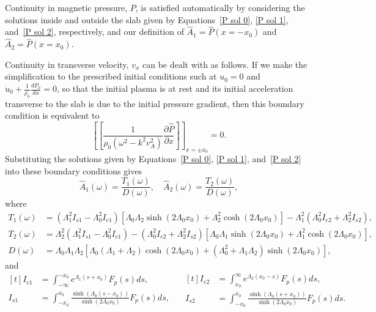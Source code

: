 \documentclass{aastex61}
\begin{document}
Continuity in magnetic pressure, $P$, is satisfied automatically by considering the solutions inside and outside the slab given by Equations~\eqref{P sol 0}, \eqref{P sol 1}, and~\eqref{P sol 2}, respectively, and our definition of $\hat{A}_1 = \hat{P}(x=-x_0)$ and $\hat{A}_2 = \hat{P}(x=x_0)$.

Continuity in transverse velocity, $v_x$ can be dealt with as follows. If we make the simplification to the prescribed initial conditions such at $u_0 = 0$ and $\dot{u}_0 + \frac{1}{\rho_0}\frac{dP_0}{dx} = 0$, so that the initial plasma is at rest and its initial acceleration transverse to the slab is due to the initial pressure gradient, then this boundary condition is equivalent to
\begin{equation}
\left[ \left[ \frac{1}{\rho_0(\omega^2 - k^2v_A^2)} \frac{\partial \hat{P}}{\partial x} \right] \right]_{x=\pm x_0} = 0.
\end{equation}
Substituting the solutions given by Equations~\eqref{P sol 0}, \eqref{P sol 1}, and~\eqref{P sol 2} into these boundary conditions gives
\begin{equation}
\hat{A}_1(\omega) = \frac{T_1(\omega)}{D(\omega)}, \quad \hat{A}_2(\omega) = \frac{T_2(\omega)}{D(\omega)},
\end{equation}
where
\begin{align}
T_1(\omega) & = (\Lambda_1^2 I_{s1} - \Lambda_0^2I_{e1})[\Lambda_0\Lambda_2\sinh(2\Lambda_0x_0) + \Lambda_2^2\cosh(2\Lambda_0x_0)] - \Lambda_1^2(\Lambda_0^2 I_{e2} + \Lambda_2^2 I_{s2}), \\
T_2(\omega) & = \Lambda_2^2(\Lambda_1^2 I_{s1} - \Lambda_0^2I_{e1}) - (\Lambda_0^2 I_{e2} + \Lambda_2^2 I_{s2})[\Lambda_0\Lambda_1\sinh(2\Lambda_0x_0) + \Lambda_1^2\cosh(2\Lambda_0x_0)], \\
D(\omega) & = \Lambda_0\Lambda_1\Lambda_2[\Lambda_0(\Lambda_1 + \Lambda_2)\cosh(2\Lambda_0x_0) + (\Lambda_0^2 + \Lambda_1\Lambda_2)\sinh(2\Lambda_0x_0)],
\label{D}
\end{align}
and
\begin{equation}
\begin{aligned}[t]
I_{e1} & = \int_{-\infty}^{-x_0} e^{\Lambda_1(s + x_0)} F_p(s) ds, \\
I_{s1} & = \int_{-x_0}^{x_0} \frac{\sinh(\Lambda_0(s - x_0))}{\sinh(2\Lambda_0x_0)} F_p(s) ds,
\end{aligned}
\quad
\begin{aligned}[t]
I_{e2} & = \int_{x_0}^\infty e^{\Lambda_2(x_0 - s)} F_p(s) ds, \\
I_{s2} & = \int_{-x_0}^{x_0} \frac{\sinh(\Lambda_0(s + x_0))}{\sinh(2\Lambda_0x_0)} F_p(s) ds.
\end{aligned}
\end{equation}
\end{document}
